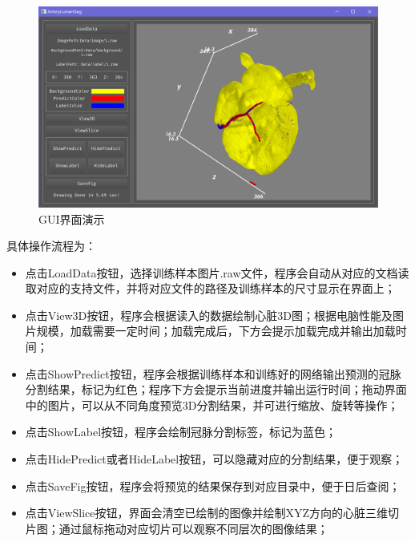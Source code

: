 \documentclass[lang=cn,11pt,a4paper,cite=numbers]{elegantpaper}
\begin{document}
\begin{figure}[H]
    \centering
    \includegraphics[scale=0.2]{./image/前期总结/GUI.png}
    \caption{GUI界面演示}
    \label{fig:GUI}
\end{figure}


具体操作流程为：

\begin{itemize}
    \item 点击LoadData按钮，选择训练样本图片.raw文件，程序会自动从对应的文档读取对应的支持文件，并将对应文件的路径及训练样本的尺寸显示在界面上；
    \item 点击View3D按钮，程序会根据读入的数据绘制心脏3D图；根据电脑性能及图片规模，加载需要一定时间；加载完成后，下方会提示加载完成并输出加载时间；
    \item 点击ShowPredict按钮，程序会根据训练样本和训练好的网络输出预测的冠脉分割结果，标记为红色；程序下方会提示当前进度并输出运行时间；拖动界面中的图片，可以从不同角度预览3D分割结果，并可进行缩放、旋转等操作；
    \item 点击ShowLabel按钮，程序会绘制冠脉分割标签，标记为蓝色；
    \item 点击HidePredict或者HideLabel按钮，可以隐藏对应的分割结果，便于观察；
    \item 点击SaveFig按钮，程序会将预览的结果保存到对应目录中，便于日后查阅；
    \item 点击ViewSlice按钮，界面会清空已绘制的图像并绘制XYZ方向的心脏三维切片图；通过鼠标拖动对应切片可以观察不同层次的图像结果；
\end{itemize}
\end{document}
